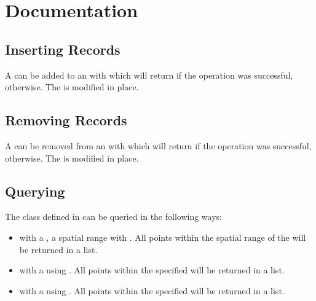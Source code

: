 \documentclass[letterpaper,10pt,english]{sphinxmanual}
\begin{document}
\section{Documentation}
\label{\detokenize{quadtree:documentation}}

\subsection{Inserting Records}
\label{\detokenize{quadtree:inserting-records}}
\sphinxAtStartPar
A  can be added to an  with  which will return  if the operation
was successful,  otherwise. The  is modified in place.


\subsection{Removing Records}
\label{\detokenize{quadtree:removing-records}}
\sphinxAtStartPar
A  can be removed from an  with  which will return  if the operation
was successful,  otherwise. The  is modified in place.


\subsection{Querying}
\label{\detokenize{quadtree:querying}}
\sphinxAtStartPar
The  class defined in  can be queried in the following ways:
\begin{itemize}
\item {}
\sphinxAtStartPar
with a , a spatial range with . All points within the spatial range of the
 will be returned in a list.

\item {}
\sphinxAtStartPar
with a  using . All points within the specified  will be returned in a list.

\item {}
\sphinxAtStartPar
with a  using . All points within the specified  will be returned in a list.

\end{itemize}
\end{document}
